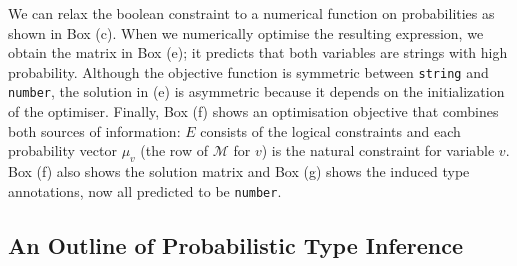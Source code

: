 \documentclass[acmsmall, review, anonymous]{acmart}\settopmatter{printfolios=true,printccs=false,printacmref=false}
\begin{document}
\begin{figure*}
{		We can relax the boolean constraint
		to a numerical function on probabilities as shown in Box (c).
		When we numerically optimise the resulting expression,
		we obtain the matrix in Box (e);
		it predicts that both variables are strings with high probability.
		Although the objective function is symmetric
		between \lstinline{string} and \lstinline{number},
		the solution in (e) is asymmetric because it depends on the initialization
		of the optimiser.
		Finally, Box (f) shows an optimisation objective that
		combines both sources of information:
		$E$ consists of the logical constraints
		and each probability vector $\mu_v$ (the row of $\mathcal{M}$ for $v$)
		is the natural constraint for variable $v$.
		Box (f) also shows the solution matrix and Box (g) shows the induced type annotations,
    		now all predicted to be \lstinline{number}.}
\label{fig:fullexample}
\vspace{-13pt}
\end{figure*}
%

\subsection{An Outline of Probabilistic Type Inference}
\end{document}
